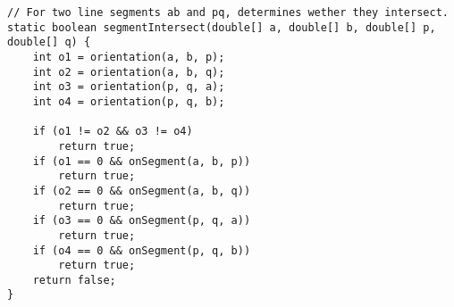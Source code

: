 \begin{verbatim}
// For two line segments ab and pq, determines wether they intersect.
static boolean segmentIntersect(double[] a, double[] b, double[] p, double[] q) {
	int o1 = orientation(a, b, p);
	int o2 = orientation(a, b, q);
	int o3 = orientation(p, q, a);
	int o4 = orientation(p, q, b);
    
	if (o1 != o2 && o3 != o4)
		return true;
	if (o1 == 0 && onSegment(a, b, p))
		return true;
	if (o2 == 0 && onSegment(a, b, q))
		return true;
	if (o3 == 0 && onSegment(p, q, a))
		return true;
	if (o4 == 0 && onSegment(p, q, b))
		return true;
	return false;
}
\end{verbatim}